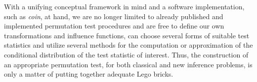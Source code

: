 \documentclass{article}
\newcommand{\Rpackage}[1]{\textit{#1}}
\newcommand{\RR}{\textsf{R}}
\renewcommand{\baselinestretch}{1}
\begin{document}

With a unifying conceptual framework in mind and a software implementation, such as
\Rpackage{coin}, at hand, we are no longer limited to already published and 
implemented permutation test procedures and are free to define our own transformations and
influence functions, can choose several forms of suitable test statistics and
utilize several methods for the computation or approximation of 
the conditional distribution of the test statistic of interest. Thus, the
construction of an appropriate permutation test, for both classical and
new inference problems, is only a matter of putting together
adequate Lego bricks.

\renewcommand{\baselinestretch}{1}




\clearpage

\pagestyle{empty}
\end{document}
